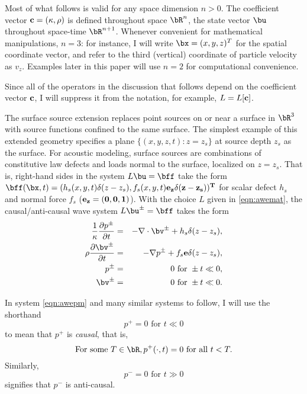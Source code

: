 Most of what follows is valid for any space dimension $n >0$. The
coefficient vector $\bf{c}=(\kappa,\rho)$ is defined throughout space
$\bR^n$, the state vector $\bu$ throughout space-time
$\bR^{n+1}$. Whenever convenient for mathematical manipulations,
$n=3$: for instance, I will write $\bx=(x,y,z)^T$ for the spatial
coordinate vector, and refer to the third (vertical) coordinate of
particle velocity as $v_z$. Examples
later in this paper will use $n=2$ for computational convenience.

Since all of the operators in the discussion that follows depend on
the coefficient vector 
$\bf{c}$, I will suppress it from the notation, for example, $L=L[\bf{c}]$.

The surface source extension replaces point sources on or near a
surface in $\bR^3$ with source functions confined to the same
surface. The simplest example of this extended geometry specifies a
plane $\{(x,y,z,t): z=z_s\}$ at source depth $z_s$ as the surface. For
acoustic modeling, surface sources are combinations of constitutive law
defects and loads normal to the surface, localized on $z=z_s$. That
is, right-hand sides in the system $L\bu=\bff$ take the form
$\bff(\bx,t) = (h_s(x,y,t)\delta(z-z_s),
f_s(x,y,t)\bf{e}_z\delta(z-z_s))^T$ for scalar defect $h_s$ and normal
force $f_s$ ($\bf{e}_z=(0,0,1)$). With the choice $L$ given in
\ref{eqn:awemat}, the causal/anti-causal wave system $L\bu^{\pm}=\bff$
takes the form
\begin{eqnarray}
\label{eqn:awepm}
\frac{1}{\kappa}\frac{\partial p^{\pm}}{\partial t} & = & - \nabla \cdot \bv^{\pm} +
h_s \delta(z-z_s), \nonumber \\
\rho\frac{\partial \bv^{\pm}}{\partial t} & = & - \nabla p^{\pm} +
                                                f_s{\bf e} \delta(z-z_s),\nonumber \\
p^{\pm} & =& 0 \mbox{ for } \pm t \ll 0,\nonumber\\ 
\bv^{\pm} & = & 0 \mbox{ for } \pm t \ll 0.
\end{eqnarray}

 In system \ref{eqn:awepm} and many similar
systems to follow, I will use the shorthand
\[
  p^+ = 0 \mbox{ for } t \ll 0 
\]
to mean that $p^+$ is {\em causal}, that is,
\[
  \mbox{For some } T \in \bR, p^+(\cdot,t) = 0 \mbox{ for all } t <
  T.
\]
Similarly,
\[
  p^- = 0 \mbox{ for } t \gg 0 
\]
signifies that $p^-$ is anti-causal.

